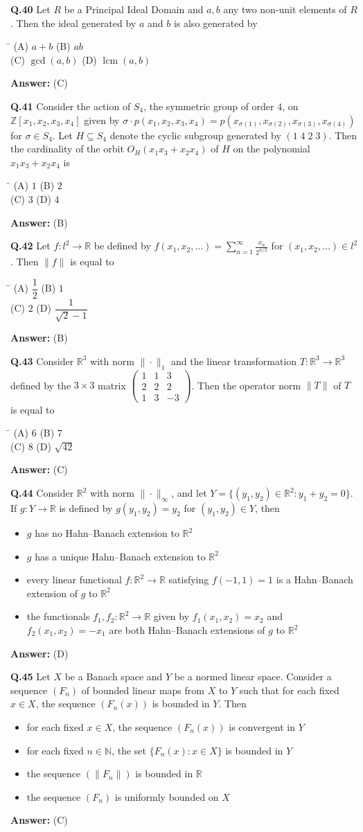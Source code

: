 \documentclass[11pt,a4paper]{article}
\newcommand{\optsfourA}[4]{%
  \begin{tabbing}
    \hspace{0.48\linewidth}\=\kill
    (A) #1 \> (B) #2 \\[2pt]
    (C) #3 \> (D) #4
  \end{tabbing}%
}
\newcommand{\optslistA}[4]{%
  \begin{itemize}
    \setlength{\itemsep}{2pt}\setlength{\parskip}{0pt}
    \item[(A)] #1
    \item[(B)] #2
    \item[(C)] #3
    \item[(D)] #4
  \end{itemize}%
}
\newcommand{\ans}[1]{\textbf{Answer:} #1\par\medskip}
\begin{document}
\textbf{Q.40} Let $R$ be a Principal Ideal Domain and $a, b$ any two non-unit elements of $R$. Then the ideal generated by $a$ and $b$ is also generated by
\optsfourA{$a + b$}{$ab$}{$\gcd(a, b)$}{$\operatorname{lcm}(a, b)$}
\ans{(C)}

\textbf{Q.41} Consider the action of $S_4$, the symmetric group of order $4$, on $\mathbb{Z}[x_1, x_2, x_3, x_4]$ given by $\sigma \cdot p(x_1, x_2, x_3, x_4) = p(x_{\sigma(1)}, x_{\sigma(2)}, x_{\sigma(3)}, x_{\sigma(4)})$ for $\sigma \in S_4$. Let $H \subseteq S_4$ denote the cyclic subgroup generated by $(1\;4\;2\;3)$. Then the cardinality of the orbit $O_H(x_1 x_3 + x_2 x_4)$ of $H$ on the polynomial $x_1 x_3 + x_2 x_4$ is
\optsfourA{$1$}{$2$}{$3$}{$4$}
\ans{(B)}

\textbf{Q.42} Let $f : l^2 \to \mathbb{R}$ be defined by $f(x_1, x_2, \dots) = \displaystyle\sum_{n=1}^{\infty} \frac{x_n}{2^{n/2}}$ for $(x_1, x_2, \dots) \in l^2$. Then $\|f\|$ is equal to
\optsfourA{$\dfrac{1}{2}$}{$1$}{$2$}{$\dfrac{1}{\sqrt{2} - 1}$}
\ans{(B)}

\textbf{Q.43} Consider $\mathbb{R}^3$ with norm $\|\cdot\|_1$ and the linear transformation $T : \mathbb{R}^3 \to \mathbb{R}^3$ defined by the $3 \times 3$ matrix $\begin{pmatrix} 1 & 1 & 3 \\ 2 & 2 & 2 \\ 1 & 3 & -3 \end{pmatrix}$. Then the operator norm $\|T\|$ of $T$ is equal to
\optsfourA{$6$}{$7$}{$8$}{$\sqrt{42}$}
\ans{(C)}

\textbf{Q.44} Consider $\mathbb{R}^2$ with norm $\|\cdot\|_\infty$, and let $Y = \{(y_1, y_2) \in \mathbb{R}^2 : y_1 + y_2 = 0\}$. If $g : Y \to \mathbb{R}$ is defined by $g(y_1, y_2) = y_2$ for $(y_1, y_2) \in Y$, then
\optslistA{$g$ has no Hahn--Banach extension to $\mathbb{R}^2$}{$g$ has a unique Hahn--Banach extension to $\mathbb{R}^2$}{every linear functional $f : \mathbb{R}^2 \to \mathbb{R}$ satisfying $f(-1, 1) = 1$ is a Hahn--Banach extension of $g$ to $\mathbb{R}^2$}{the functionals $f_1, f_2 : \mathbb{R}^2 \to \mathbb{R}$ given by $f_1(x_1, x_2) = x_2$ and $f_2(x_1, x_2) = -x_1$ are both Hahn--Banach extensions of $g$ to $\mathbb{R}^2$}
\ans{(D)}

\textbf{Q.45} Let $X$ be a Banach space and $Y$ be a normed linear space. Consider a sequence $(F_n)$ of bounded linear maps from $X$ to $Y$ such that for each fixed $x \in X$, the sequence $(F_n(x))$ is bounded in $Y$. Then
\optslistA{for each fixed $x \in X$, the sequence $(F_n(x))$ is convergent in $Y$}{for each fixed $n \in \mathbb{N}$, the set $\{F_n(x) : x \in X\}$ is bounded in $Y$}{the sequence $(\|F_n\|)$ is bounded in $\mathbb{R}$}{the sequence $(F_n)$ is uniformly bounded on $X$}
\ans{(C)}
\end{document}
